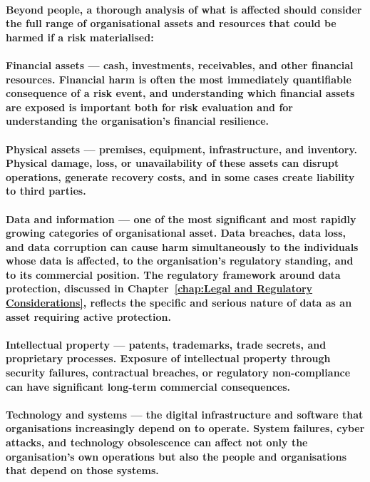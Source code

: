 \paragraph{Beyond people, a thorough analysis of what is affected should consider the full range of organisational assets and resources that could be harmed if a risk materialised:}
\paragraph{\textbf{Financial assets} — cash, investments, receivables, and other financial resources. Financial harm is often the most immediately quantifiable consequence of a risk event, and understanding which financial assets are exposed is important both for risk evaluation and for understanding the organisation's financial resilience.}
\paragraph{\textbf{Physical assets} — premises, equipment, infrastructure, and inventory. Physical damage, loss, or unavailability of these assets can disrupt operations, generate recovery costs, and in some cases create liability to third parties.}
\paragraph{\textbf{Data and information} — one of the most significant and most rapidly growing categories of organisational asset. Data breaches, data loss, and data corruption can cause harm simultaneously to the individuals whose data is affected, to the organisation's regulatory standing, and to its commercial position. The regulatory framework around data protection, discussed in Chapter~\ref{chap:Legal and Regulatory Considerations}, reflects the specific and serious nature of data as an asset requiring active protection.}
\paragraph{\textbf{Intellectual property} — patents, trademarks, trade secrets, and proprietary processes. Exposure of intellectual property through security failures, contractual breaches, or regulatory non-compliance can have significant long-term commercial consequences.}
\paragraph{\textbf{Technology and systems} — the digital infrastructure and software that organisations increasingly depend on to operate. System failures, cyber attacks, and technology obsolescence can affect not only the organisation's own operations but also the people and organisations that depend on those systems.}
